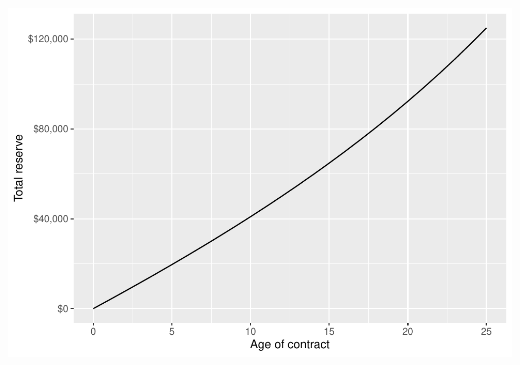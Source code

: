 \documentclass[
]{article}
\begin{document}
\includegraphics{Exercises-chp_4_files/figure-latex/unnamed-chunk-12-1.pdf}
\end{document}
